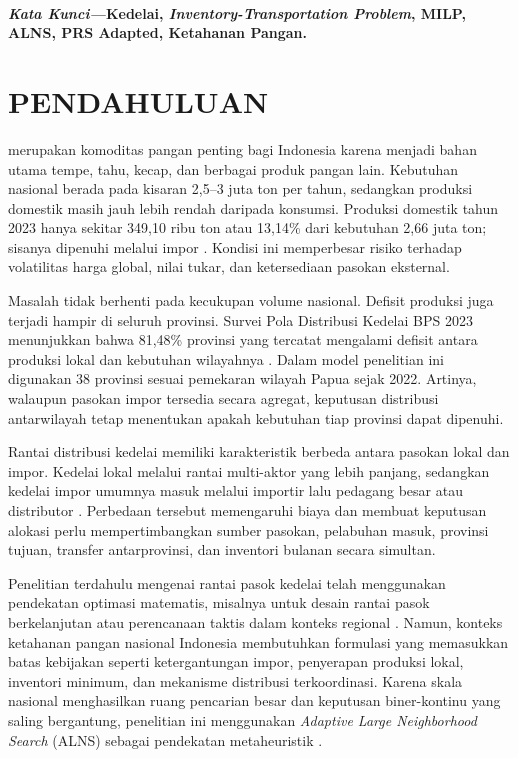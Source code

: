 \documentclass[journal]{IEEEtran}
\theoremstyle{definition}
\theoremstyle{definition}
\theoremstyle{plain}
\newcommand{\katakunci}[1]{%
    \noindent\\
    \textit{\textbf{Kata Kunci---}}{\textbf{#1}}
}
\begin{document}
    \katakunci{\small Kedelai, \textit{Inventory-Transportation Problem}, MILP, ALNS, PRS Adapted, Ketahanan Pangan.}

    \IEEEpeerreviewmaketitle

     \section{PENDAHULUAN}
     \normalsize {} merupakan komoditas pangan penting bagi Indonesia karena menjadi bahan utama tempe, tahu, kecap, dan berbagai produk pangan lain. Kebutuhan nasional berada pada kisaran 2,5--3 juta ton per tahun, sedangkan produksi domestik masih jauh lebih rendah daripada konsumsi. Produksi domestik tahun 2023 hanya sekitar 349,10 ribu ton atau 13,14\% dari kebutuhan 2,66 juta ton; sisanya dipenuhi melalui impor \cite{kementan2024kedelai,pusdatin2024konsumsi}. Kondisi ini memperbesar risiko terhadap volatilitas harga global, nilai tukar, dan ketersediaan pasokan eksternal.

     Masalah tidak berhenti pada kecukupan volume nasional. Defisit produksi juga terjadi hampir di seluruh provinsi. Survei Pola Distribusi Kedelai BPS 2023 menunjukkan bahwa 81,48\% provinsi yang tercatat mengalami defisit antara produksi lokal dan kebutuhan wilayahnya \cite{bps2023distribusi}. Dalam model penelitian ini digunakan 38 provinsi sesuai pemekaran wilayah Papua sejak 2022. Artinya, walaupun pasokan impor tersedia secara agregat, keputusan distribusi antarwilayah tetap menentukan apakah kebutuhan tiap provinsi dapat dipenuhi.

     Rantai distribusi kedelai memiliki karakteristik berbeda antara pasokan lokal dan impor. Kedelai lokal melalui rantai multi-aktor yang lebih panjang, sedangkan kedelai impor umumnya masuk melalui importir lalu pedagang besar atau distributor \cite{cips2023logistics}. Perbedaan tersebut memengaruhi biaya dan membuat keputusan alokasi perlu mempertimbangkan sumber pasokan, pelabuhan masuk, provinsi tujuan, transfer antarprovinsi, dan inventori bulanan secara simultan.

     Penelitian terdahulu mengenai rantai pasok kedelai telah menggunakan pendekatan optimasi matematis, misalnya untuk desain rantai pasok berkelanjutan atau perencanaan taktis dalam konteks regional \cite{SHARIFI2023,reis2023stochastic}. Namun, konteks ketahanan pangan nasional Indonesia membutuhkan formulasi yang memasukkan batas kebijakan seperti ketergantungan impor, penyerapan produksi lokal, inventori minimum, dan mekanisme distribusi terkoordinasi. Karena skala nasional menghasilkan ruang pencarian besar dan keputusan biner-kontinu yang saling bergantung, penelitian ini menggunakan \textit{Adaptive Large Neighborhood Search} (ALNS) sebagai pendekatan metaheuristik \cite{pisinger2018lns,fathollahifard2023alns}.
\end{document}
